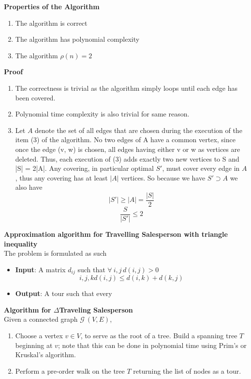 \textbf{Properties of the Algorithm}\\
\begin{enumerate}
    \item The algorithm is correct
    \item The algorithm has polynomial complexity
    \item The algorithm $\rho(n) = 2$
\end{enumerate}
\textbf{Proof}
\begin{enumerate}
    \item
        The correctness is trivial
        as the algorithm simply loops until each edge has been covered.
    \item
        Polynomial time complexity is also trivial for same reason.
    \item
        Let $A$ denote the set of all edges that are chosen during the execution of the item (3) of the algorithm.
        No two edges of A have a common vertex, since once the edge (v, w) is chosen, all edges having either v or w as vertices are deleted.
        Thus, each execution of (3) adds exactly two new vertices to S and |S| = 2|A|.
        Any covering, in particular optimal $S\prime$, must cover every edge in $A$, thus any covering has at least $|A|$ vertices.
        So because we have $S\prime \supset A$ we also have
        $$|S\prime| \geq |A| = \frac{|S|}{2}$$
        $$\frac{S}{|S\prime|} \leq 2$$
\end{enumerate}

\textbf{Approximation algorithm for Travelling Salesperson with triangle inequality}\\
The problem is formulated as such
\begin{itemize}
    \item \textbf{Input}:
        A matrix $d_{ij}$ such that $\forall\ i,j\, d(i,j) > 0$
        $$
        i,j,k d(i,j) \leq d(i,k) + d(k,j)
        $$
    \item \textbf{Output}:
        A tour such that every 
\end{itemize}

\textbf{Algorithm for $\Delta$Traveling Salesperson}\\
Given a connected graph $\mathcal{G}\ (V,E)$,
\begin{enumerate}
    \item
        Choose a vertex $v \in V$, to serve as the root of a tree.
        Build a spanning tree $T$ beginning at $v$;
        note that this can be done in polynomial time using Prim's or Kruskal's algorithm.
    \item
        Perform a pre-order walk on the tree $T$ returning the list of nodes as a tour.
\end{enumerate}

